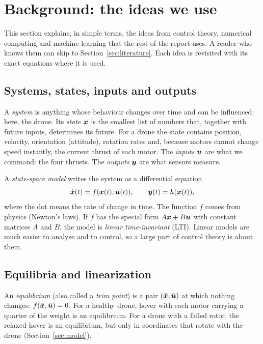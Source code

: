 \section{Background: the ideas we use}\label{sec:background}
This section explains, in simple terms, the ideas from control theory, numerical computing and machine learning that the rest of the report uses. A reader who knows them can skip to Section~\ref{sec:literature}. Each idea is revisited with its exact equations where it is used.

\subsection{Systems, states, inputs and outputs}
A \emph{system} is anything whose behaviour changes over time and can be influenced: here, the drone. Its \emph{state} $\boldsymbol{x}$ is the smallest list of numbers that, together with future inputs, determines its future. For a drone the state contains position, velocity, orientation (attitude), rotation rates and, because motors cannot change speed instantly, the current thrust of each motor. The \emph{inputs} $\boldsymbol{u}$ are what we command: the four thrusts. The \emph{outputs} $\boldsymbol{y}$ are what sensors measure.

A \emph{state-space model} writes the system as a differential equation
\begin{equation}
  \dot{\boldsymbol{x}}(t) = f(\boldsymbol{x}(t), \boldsymbol{u}(t)), \qquad \boldsymbol{y}(t) = h(\boldsymbol{x}(t)),
\end{equation}
where the dot means the rate of change in time. The function $f$ comes from physics (Newton's laws). If $f$ has the special form $A\boldsymbol{x} + B\boldsymbol{u}$ with constant matrices $A$ and $B$, the model is \emph{linear time-invariant} (LTI). Linear models are much easier to analyse and to control, so a large part of control theory is about them.

\subsection{Equilibria and linearization}
An \emph{equilibrium} (also called a \emph{trim point}) is a pair $(\bar{\boldsymbol{x}},\bar{\boldsymbol{u}})$ at which nothing changes: $f(\bar{\boldsymbol{x}},\bar{\boldsymbol{u}})=0$. For a healthy drone, hover with each motor carrying a quarter of the weight is an equilibrium. For a drone with a failed rotor, the relaxed hover is an equilibrium, but only in coordinates that rotate with the drone (Section~\ref{sec:model}).


